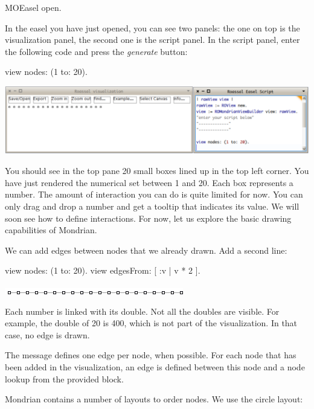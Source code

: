 \documentclass[a4paper,10pt,twoside]{book}
\begin{document}
\begin{code}{}
MOEasel open.
\end{code}

In the easel you have just opened, you can see two panels: the one on top is the visualization panel, the second one is the script panel. In the script panel, enter the following code and press the \emph{generate} button:

\begin{code}{}
view nodes: (1 to: 20).
\end{code}
\begin{center}\includegraphics[scale=0.45]{picture1}\end{center}

You should see in the top pane 20 small boxes lined up in the top left corner. You have just rendered the numerical set between 1 and 20. Each box represents a number. The amount of interaction you can do is quite limited for now. You can only drag and drop a number and get a tooltip that indicates its value. We will soon see how to define interactions. For now, let us explore the basic drawing capabilities of Mondrian.

We can add edges between nodes that we already drawn. Add a second line:

\begin{code}{}
view nodes: (1 to: 20).
view edgesFrom: [ :v | v * 2 ].
\end{code}
\begin{center}\includegraphics[scale=0.4]{picture2}\end{center}

Each number is linked with its double. Not all the doubles are visible. For example, the double of 20 is 400, which is not part of the visualization. In that case, no edge is drawn. 

The message  defines one edge per node, when possible. For each node that has been added in the visualization, an edge is defined between this node and a node lookup from the provided block.

Mondrian contains a number of layouts to order nodes. We use the circle layout:
\end{document}
